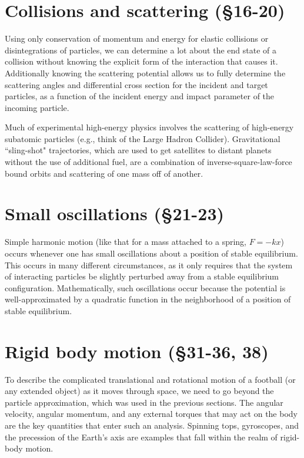 \documentclass[10pt]{article}
\numberwithin{equation}{section}
\begin{document}
\section{Collisions and scattering (\S16-20)}

Using only conservation of momentum and energy 
for elastic collisions or disintegrations of 
particles, we can determine a lot about the 
end state of a collision without knowing the 
explicit form of the interaction that causes it.
Additionally knowing the scattering potential 
allows us to fully determine the 
scattering angles and differential cross section 
for the incident and target particles, as a function 
of the incident energy and impact parameter of 
the incoming particle.

Much of experimental high-energy physics involves the 
scattering of high-energy subatomic particles (e.g., 
think of the Large Hadron Collider).
Gravitational ``sling-shot" trajectories, which are 
used to get satellites to distant planets without the use of 
additional fuel, are a combination of inverse-square-law-force
bound orbits and scattering of one mass off of another.
 
\section{Small oscillations (\S21-23)}

Simple harmonic motion (like that for a mass attached to 
a spring, $F=-kx$) occurs whenever one has small oscillations 
about a position of stable equilibrium.
This occurs in many different circumstances, as it 
only requires that the system of interacting 
particles be slightly perturbed away from a stable 
equilibrium configuration.
Mathematically, such oscillations occur because
the potential is well-approximated by a quadratic 
function in the neighborhood of a position of stable 
equilibrium.

\section{Rigid body motion (\S31-36, 38)}

To describe the complicated translational and rotational 
motion of a football (or any extended object) as 
it moves through space, we need to go beyond the 
particle approximation, which was used in the previous sections.
The angular velocity, angular momentum, and any external
torques that may act on the body are the key quantities that 
enter such an analysis.
Spinning tops, gyroscopes, and the precession of the 
Earth's axis are examples that fall within the realm of 
rigid-body motion.
\end{document}
